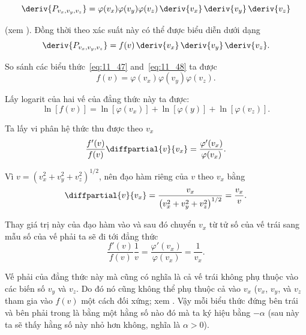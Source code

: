 \begin{equation}\label{eq:11_47}
	\deriv{P_{v_x, v_y, v_z}} = \varphi(v_x)\varphi(v_y)\varphi(v_z)\,\deriv{v_x}\,\deriv{v_y}\,\deriv{v_z}
\end{equation}

\noindent
(xem ). Đồng thời theo  xác suất này có thể được biểu diễn dưới dạng
\begin{equation}\label{eq:11_48}
	\deriv{P_{v_x, v_y, v_z}} = f(v)\,\deriv{v_x}\,\deriv{v_y}\,\deriv{v_z}.
\end{equation}

So sánh các biểu thức~\eqref{eq:11_47} and~\eqref{eq:11_48} ta được 
\begin{equation}\label{eq:11_49}
	f(v) = \varphi(v_x)\varphi(v_y)\varphi(v_z).
\end{equation}

\noindent
Lấy logarit của hai vế của đẳng thức này ta được:
\begin{equation*}
	\ln[f(v)] = \ln[\varphi(v_x)] + \ln[\varphi(y)] + \ln[\varphi(v_z)].
\end{equation*}

\noindent
Ta lấy vi phân hệ thức thu được theo $v_x$
\begin{equation}\label{eq:11_50}
	\frac{f'(v)}{f(v)}\diffpartial{v}{v_x} = \frac{\varphi'(v_x)}{\varphi(v_x)}.
\end{equation}

Vì $v=\left(v_x^2+v_y^2+v_z^2\right)^{1/2}$, nên đạo hàm riêng của $v$ theo $v_x$ bằng
\begin{equation*}
	\diffpartial{v}{v_x} = \frac{v_x}{\left(v_x^2+v_y^2+v_z^2\right)^{1/2}} = \frac{v_x}{v}.
\end{equation*}

\noindent

Thay giá trị này của đạo hàm vào  và sau đó chuyển $v_x$ từ tử số của vế trái sang mẫu số của vế phải ta sẽ đi tới đẳng thức 
\begin{equation}\label{eq:11_51}
	\frac{f'(v)}{f(v)}\frac{1}{v} = \frac{\varphi'(v_x)}{\varphi(v_x)} = \frac{1}{v_x}.
\end{equation}

\noindent
Vế phải của đẳng thức này mà cũng có nghĩa là cả vế trái không phụ thuộc vào các biến số $v_y$ và $v_z$. Do đó nó cũng không thể phụ thuộc cả vào $v_x$ ($v_x$, $v_y$, và $v_z$ tham gia vào $f(v)$ một cách đối xứng; xem . Vậy mỗi biểu thức đứng bên trái và bên phải trong  là bằng một hằng số nào đó mà ta ký hiệu bằng $-\alpha$ (sau này ta sẽ thấy hằng số này nhỏ hơn không, nghĩa là $\alpha > 0$).

